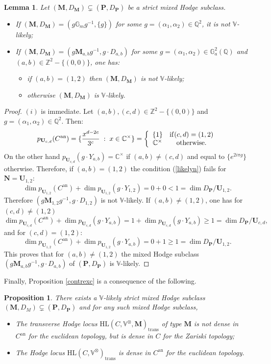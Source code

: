 \documentclass[10pt]{article}
\numberwithin{equation}{subsection}
\theoremstyle{plain}
\newtheorem{lemma}[theorem]{Lemma}
\newtheorem{proposition}[theorem]{Proposition}
\theoremstyle{definition}
\theoremstyle{remark}
\newcommand{\Z}{\mathbb Z}
\newcommand{\Q}{\mathbb Q}
\newcommand{\C}{\mathbb C}
\newcommand{\V}{\mathbb V}
\newcommand{\mult}{\mathbb G}
\newcommand{\pp}{\mathbf P}
\newcommand{\uu}{\mathbf U}
\newcommand{\M}{\mathbf M}
\newcommand{\NN}{\mathbf N}
\newcommand{\an}{\mathrm{an}}
\newcommand{\trans}{\mathrm{trans}}
\begin{document}
\begin{lemma}\label{likelyc}
Let $(\M,D_\M) \subsetneq (\pp, D_\pp)$ be a strict mixed Hodge subclass.
\begin{itemize}
\item[(i)] If $(\M,D_\M) = (g\mult_mg^{-1}, \{g\})$ for some $g = (\alpha_1, \alpha_2) \in \Q^2$, it is not $\V$-likely;
\item[(ii)] If $(\M,D_\M) = (g\M_{a,b}g^{-1}, g \cdot D_{a,b})$ for some $g = (\alpha_1, \alpha_2) \in \mult_a^2(\Q)$ and $(a,b) \in \Z^2-\{(0,0)\}$, one has:
\begin{itemize}
\item[$(ii_1)$] if $(a,b) = (1,2)$ then $(\M,D_\M)$ is not $\V$-likely;
\item[$(ii_2)$] otherwise $(\M,D_\M)$ is $\V$-likely.
\end{itemize}
\end{itemize}
\end{lemma}
\begin{proof}
$(i)$ is immediate. Let $(a,b), (c,d) \in \Z^2-\{(0,0)\}$ and $g = (\alpha_1, \alpha_2) \in \Q^2$. Then:
\[
p_{\uu_{c,d}}(C^\an) = \{\frac{x^{d-2c}}{3^c} \hspace{0.1cm} : \hspace{0.1cm} x \in \C^\times\} = \left\{\begin{array}{cc}\{1\} & \mathrm{if} (c,d) = (1,2) \\\C^\times & \mathrm{otherwise.}\end{array}\right.
\]
On the other hand $p_{\uu_{c,d}}(g \cdot Y_{a,b}) = \C^\times$ if $(a,b) \neq (c,d)$ and equal to $\{e^{2i\pi g}\}$ otherwise. Therefore, if $(a,b) = (1,2)$ the condition (\ref{likelyn}) fails for $\NN = \uu_{1,2}$:
\[
\dim p_{\uu_{1,2}}(C^\an) + \dim p_{\uu_{1,2}}(g \cdot Y_{1,2}) = 0+0 < 1 = \dim D_\pp/\uu_{1,2}.
\]
Therefore $(g\M_{1,2}g^{-1}, g \cdot D_{1,2})$ is not $\V$-likely. If $(a,b) \neq (1,2)$, one has for $(c,d) \neq (1,2)$
\[
\dim p_{\uu_{c,d}}(C^\an) + \dim p_{\uu_{c,d}}(g \cdot Y_{a,b}) = 1+ \dim p_{\uu_{c,d}}(g \cdot Y_{a,b}) \geqslant 1 = \dim D_\pp/\uu_{c,d},
\]
and for $(c,d) = (1,2)$:
\[
\dim p_{\uu_{1,2}}(C^\an) + \dim p_{\uu_{1,2}}(g \cdot Y_{a,b}) = 0+1 \geqslant 1 = \dim D_\pp/\uu_{1,2}.
\]
This proves that for $(a,b) \neq (1,2)$ the mixed Hodge subclass $(g\M_{a,b}g^{-1}, g \cdot D_{a,b})$ of $(\pp, D_\pp)$ is $\V$-likely.
\end{proof}
Finally, Proposition \ref{contrexc} is a consequence of the following.
\begin{proposition}
There exists a $\V$-likely strict mixed Hodge subclass $(\M,D_M) \subsetneq (\pp,D_\pp)$ and for any such mixed Hodge subclass,
\begin{itemize}
\item[(i)] The transverse Hodge locus $\mathrm{HL}(C, \V^\otimes, \M)_\trans$ of type $\M$ is not dense in $C^\an$ for the euclidean topology, but is dense in $C$ for the Zariski topology;
\item[(ii)] The Hodge locus $\mathrm{HL}(C, \V^\otimes)_\trans$ is dense in $C^\an$ for the euclidean topology.
\end{itemize}
\end{proposition}
\end{document}
